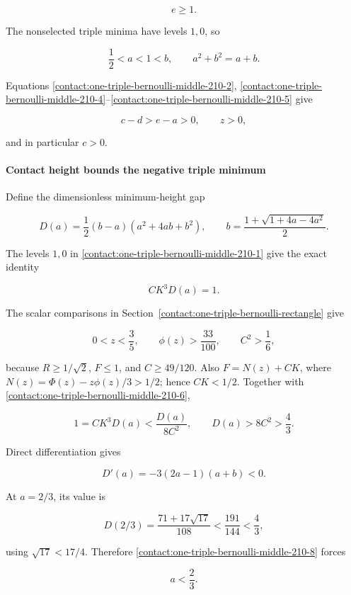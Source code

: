 \[
 \boxed{\quad e\geq1.\quad}
\tag{B.11.4}\label{contact:one-triple-bernoulli-middle-210-4}
\]

The nonselected triple minima have levels $1,0$, so

\[
 \frac12<a<1<b,\qquad a^2+b^2=a+b.
\tag{B.11.5}\label{contact:one-triple-bernoulli-middle-210-5}
\]

Equations \eqref{contact:one-triple-bernoulli-middle-210-2}, \eqref{contact:one-triple-bernoulli-middle-210-4}--\eqref{contact:one-triple-bernoulli-middle-210-5} give

\[
 c-d>e-a>0,\qquad z>0,
\]

and in particular $c>0$.

\paragraph{Contact height bounds the negative triple minimum}

Define the dimensionless minimum-height gap

\[
 D(a)=\frac12(b-a)(a^2+4ab+b^2),\qquad
 b=\frac{1+\sqrt{1+4a-4a^2}}2.
\]

The levels $1,0$ in \eqref{contact:one-triple-bernoulli-middle-210-1} give the exact identity

\[
 CK^3 D(a)=1.
\tag{B.11.6}\label{contact:one-triple-bernoulli-middle-210-6}
\]

The scalar comparisons in Section~\ref{contact:one-triple-bernoulli-rectangle} give

\[
 0<z<\frac35,\qquad \phi(z)>\frac{33}{100},\qquad
 C^2>\frac16,
\tag{B.11.7}\label{contact:one-triple-bernoulli-middle-210-7}
\]

because $R\ge 1/\sqrt{2}$, $F\le 1$, and $C\ge49/120$. Also
$F=N(z)+CK$, where $N(z)=\Phi(z)-z \phi(z)/3>1/2$; hence $CK<1/2$.
Together with \eqref{contact:one-triple-bernoulli-middle-210-6},

\[
 1=CK^3D(a)<\frac{D(a)}{8C^2},\qquad D(a)>8C^2>\frac43.
\tag{B.11.8}\label{contact:one-triple-bernoulli-middle-210-8}
\]

Direct differentiation gives

\[
 D'(a)=-3(2a-1)(a+b)<0.
\]

At $a=2/3$, its value is

\[
 D(2/3)=\frac{71+17\sqrt{17}}{108}
 <\frac{191}{144}<\frac43,
\]

using $\sqrt{17}<17/4$. Therefore \eqref{contact:one-triple-bernoulli-middle-210-8} forces

\[
 \boxed{\quad a<\frac23.\quad}
\tag{B.11.9}\label{contact:one-triple-bernoulli-middle-210-9}
\]


